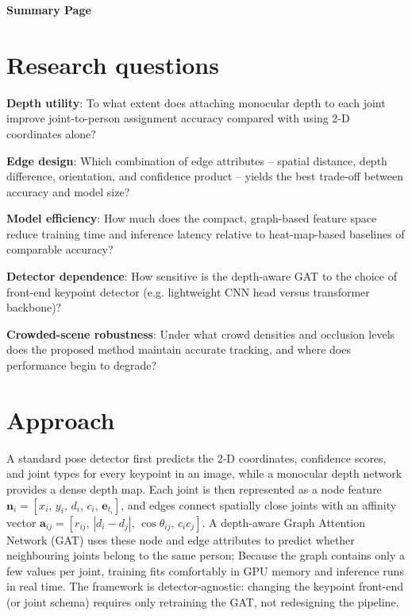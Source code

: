 
{\Large\bfseries Summary Page}
\section{Research questions}
\begin{compactitem}
    \item \textbf{Depth utility}:  
    To what extent does attaching monocular depth to each joint improve joint-to-person assignment accuracy compared with using 2-D coordinates alone?
    \item \textbf{Edge design}:  
    Which combination of edge attributes -- spatial distance, depth difference, orientation, and confidence product -- yields the best trade-off between accuracy and model size?
    \item \textbf{Model efficiency}:  
    How much does the compact, graph-based feature space reduce training time and inference latency relative to heat-map-based baselines of comparable accuracy?
    \item \textbf{Detector dependence}:  
    How sensitive is the depth-aware GAT to the choice of front-end keypoint detector (e.g. lightweight CNN head versus transformer backbone)?
    \item \textbf{Crowded-scene robustness}:  
    Under what crowd densities and occlusion levels does the proposed method maintain accurate tracking, and where does performance begin to degrade?
\end{compactitem}

\section{Approach} A standard pose detector first predicts the 2-D coordinates,
confidence scores, and joint types for every keypoint in an image, while a
monocular depth network provides a dense depth map. Each joint is then
represented as a node feature
$\mathbf{n}_i=[x_i,\,y_i,\,d_i,\,c_i,\,\mathbf{e}_{t_i}]$, and edges connect
spatially close joints with an affinity vector
$\mathbf{a}_{ij}=[r_{ij},\,|d_i-d_j|,\,\cos\theta_{ij},\,c_i c_j]$. A
depth-aware Graph Attention Network (GAT) uses these node and edge attributes
to predict whether neighbouring joints belong to the same person; Because the
graph contains only a few values per joint, training fits comfortably in GPU
memory and inference runs in real time. The framework is detector-agnostic:
changing the keypoint front-end (or joint schema) requires only retraining the
GAT, not redesigning the pipeline.

